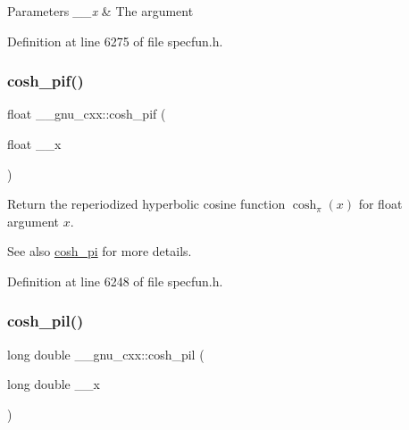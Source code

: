 \begin{DoxyParams}{Parameters}
{\em \+\_\+\+\_\+x} & The argument \\
\hline
\end{DoxyParams}


Definition at line 6275 of file specfun.\+h.

\mbox{\label{group__gnu__math__spec__func_ga79a2f5c9da96b5ea6c663d6efca24944}} 
\subsubsection{\texorpdfstring{cosh\+\_\+pif()}{cosh\_pif()}}
{\footnotesize\ttfamily float \+\_\+\+\_\+gnu\+\_\+cxx\+::cosh\+\_\+pif (\begin{DoxyParamCaption}\item[{float}]{\+\_\+\+\_\+x }\end{DoxyParamCaption})\hspace{0.3cm}{\ttfamily [inline]}}

Return the reperiodized hyperbolic cosine function $ \cosh_\pi(x) $ for {\ttfamily float} argument $ x $.

\begin{DoxySeeAlso}{See also}
\hyperlink{group__gnu__math__spec__func_gaf59c68a01adfdab0f22c4fb405ab2a36}{cosh\+\_\+pi} for more details. 
\end{DoxySeeAlso}


Definition at line 6248 of file specfun.\+h.

\mbox{\label{group__gnu__math__spec__func_gab7bf4f591dd35af2bdb88a8219f5e248}} 
\subsubsection{\texorpdfstring{cosh\+\_\+pil()}{cosh\_pil()}}
{\footnotesize\ttfamily long double \+\_\+\+\_\+gnu\+\_\+cxx\+::cosh\+\_\+pil (\begin{DoxyParamCaption}\item[{long double}]{\+\_\+\+\_\+x }\end{DoxyParamCaption})\hspace{0.3cm}{\ttfamily [inline]}}

